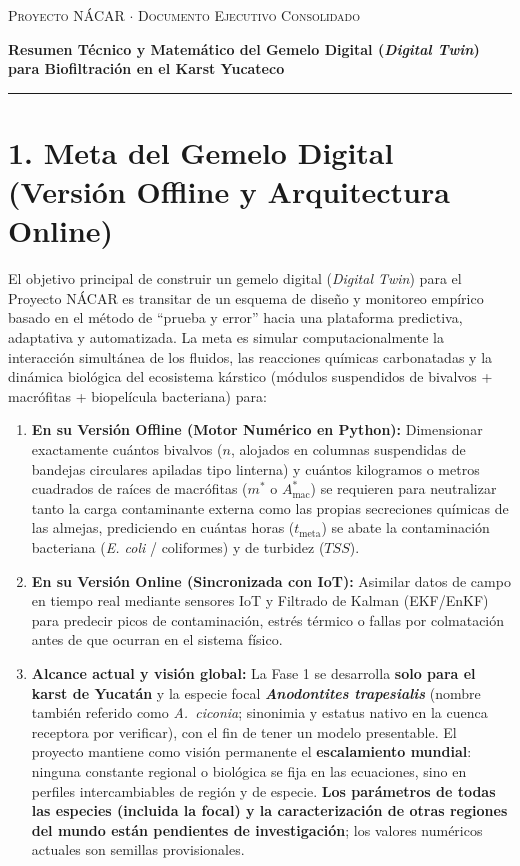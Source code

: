 \documentclass[11pt,letterpaper]{article}
\begin{document}
\begin{center}
    {\scshape\large Proyecto NÁCAR $\cdot$ Documento Ejecutivo Consolidado \par}
    \vspace{0.2cm}
    {\LARGE\bfseries\color{nacardark} Resumen Técnico y Matemático del Gemelo Digital (\textit{Digital Twin}) para Biofiltración en el Karst Yucateco \par}
    \vspace{0.2cm}
    \rule{\textwidth}{1.2pt}
\end{center}

\section*{1. Meta del Gemelo Digital (Versión Offline y Arquitectura Online)}
El objetivo principal de construir un gemelo digital (\textit{Digital Twin}) para el Proyecto NÁCAR es transitar de un esquema de diseño y monitoreo empírico basado en el método de ``prueba y error'' hacia una plataforma predictiva, adaptativa y automatizada. La meta es simular computacionalmente la interacción simultánea de los fluidos, las reacciones químicas carbonatadas y la dinámica biológica del ecosistema kárstico (módulos suspendidos de bivalvos + macrófitas + biopelícula bacteriana) para:
\begin{enumerate}[leftmargin=1.5em,noitemsep]
    \item \textbf{En su Versión Offline (Motor Numérico en Python):} Dimensionar exactamente cuántos bivalvos ($n$, alojados en columnas suspendidas de bandejas circulares apiladas tipo linterna) y cuántos kilogramos o metros cuadrados de raíces de macrófitas ($m^*$ o $A_{\text{mac}}^*$) se requieren para neutralizar tanto la carga contaminante externa como las propias secreciones químicas de las almejas, prediciendo en cuántas horas ($t_{\text{meta}}$) se abate la contaminación bacteriana (\textit{E. coli} / coliformes) y de turbidez ($TSS$).
    \item \textbf{En su Versión Online (Sincronizada con IoT):} Asimilar datos de campo en tiempo real mediante sensores IoT y Filtrado de Kalman (EKF/EnKF) para predecir picos de contaminación, estrés térmico o fallas por colmatación antes de que ocurran en el sistema físico.
    \item \textbf{Alcance actual y visión global:} La Fase 1 se desarrolla \textbf{solo para el karst de Yucatán} y la especie focal \textbf{\textit{Anodontites trapesialis}} (nombre también referido como \textit{A.\ ciconia}; sinonimia y estatus nativo en la cuenca receptora por verificar), con el fin de tener un modelo presentable. El proyecto mantiene como visión permanente el \textbf{escalamiento mundial}: ninguna constante regional o biológica se fija en las ecuaciones, sino en perfiles intercambiables de región y de especie. \textbf{Los parámetros de todas las especies (incluida la focal) y la caracterización de otras regiones del mundo están pendientes de investigación}; los valores numéricos actuales son semillas provisionales.
\end{enumerate}
\end{document}
